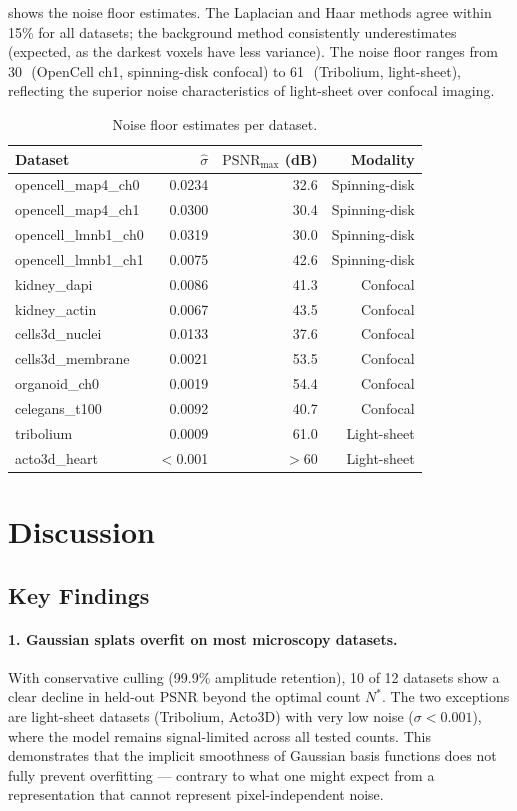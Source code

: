 \documentclass[11pt, a4paper]{article}
\theoremstyle{plain}
\theoremstyle{definition}
\theoremstyle{remark}
\newcommand{\PSNR}{\mathrm{PSNR}}
\newcommand{\dB}{\,\mathrm{dB}}
\begin{document}
 shows the noise floor estimates. The Laplacian
and Haar methods agree within 15\% for all datasets; the background
method consistently underestimates (expected, as the darkest voxels have
less variance). The noise floor ranges from 30\dB\ (OpenCell ch1,
spinning-disk confocal) to 61\dB\ (Tribolium, light-sheet), reflecting
the superior noise characteristics of light-sheet over confocal imaging.

\begin{table}[H]
\centering
\caption{Noise floor estimates per dataset.}
\label{tab:noise-floor}
\small
\begin{tabular}{@{}lrrr@{}}
\toprule
Dataset & $\hat{\sigma}$ & $\PSNR_{\max}$ (dB) & Modality \\
\midrule
opencell\_map4\_ch0 & 0.0234 & 32.6 & Spinning-disk \\
opencell\_map4\_ch1 & 0.0300 & 30.4 & Spinning-disk \\
opencell\_lmnb1\_ch0 & 0.0319 & 30.0 & Spinning-disk \\
opencell\_lmnb1\_ch1 & 0.0075 & 42.6 & Spinning-disk \\
kidney\_dapi & 0.0086 & 41.3 & Confocal \\
kidney\_actin & 0.0067 & 43.5 & Confocal \\
cells3d\_nuclei & 0.0133 & 37.6 & Confocal \\
cells3d\_membrane & 0.0021 & 53.5 & Confocal \\
organoid\_ch0 & 0.0019 & 54.4 & Confocal \\
celegans\_t100 & 0.0092 & 40.7 & Confocal \\
tribolium & 0.0009 & 61.0 & Light-sheet \\
acto3d\_heart & $<$0.001 & $>$60 & Light-sheet \\
\bottomrule
\end{tabular}
\end{table}


\section{Discussion}
\label{sec:discussion}

\subsection{Key Findings}

\paragraph{1. Gaussian splats overfit on most microscopy datasets.}
With conservative culling (99.9\% amplitude retention), 10 of 12 datasets
show a clear decline in held-out PSNR beyond the optimal count $N^*$.
The two exceptions are light-sheet datasets (Tribolium, Acto3D) with
very low noise ($\sigma < 0.001$), where the model remains signal-limited
across all tested counts. This demonstrates that the implicit smoothness
of Gaussian basis functions does not fully prevent overfitting ---
contrary to what one might expect from a representation that cannot
represent pixel-independent noise.
\end{document}
